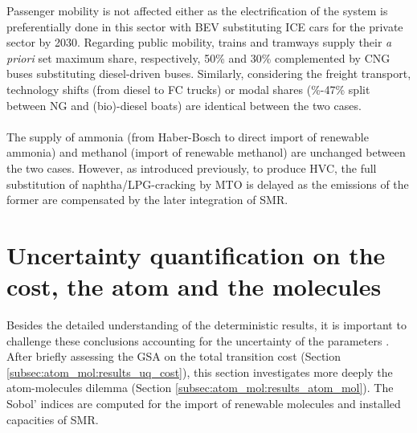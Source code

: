 Passenger mobility is not affected either as the electrification of the system is preferentially done in this sector with \gls{BEV} substituting \gls{ICE} cars for the private sector by 2030. Regarding public mobility, trains and tramways supply their \textit{a priori} set maximum share, respectively, 50\% and 30\% complemented by \gls{CNG} buses substituting diesel-driven buses. Similarly, considering the freight transport, technology shifts (\ie from diesel to \gls{FC} trucks) or modal shares (\%-47\% split between \gls{NG} and (bio)-diesel boats) are identical between the two cases.\\

\\

The supply of ammonia (\ie from Haber-Bosch to direct import of renewable ammonia) and methanol (\ie import of renewable methanol) are unchanged between the two cases. However, as introduced previously, to produce \gls{HVC}, the full substitution of naphtha/LPG-cracking by \gls{MTO} is delayed as the emissions of the former are compensated by the later integration of \gls{SMR}.

\section{Uncertainty quantification on the cost, the atom and the molecules}
\label{sec:atom_mol:results_uq}
Besides the detailed understanding of the deterministic results, it is important to challenge these conclusions accounting for the uncertainty of the parameters \cite{guevara2020machine}. After briefly assessing the \acrfull{GSA} on the total transition cost (Section \ref{subsec:atom_mol:results_uq_cost}), this section investigates more deeply the atom-molecules dilemma (Section \ref{subsec:atom_mol:results_atom_mol}). The Sobol' indices are computed for the import of renewable molecules and installed capacities of \gls{SMR}.

